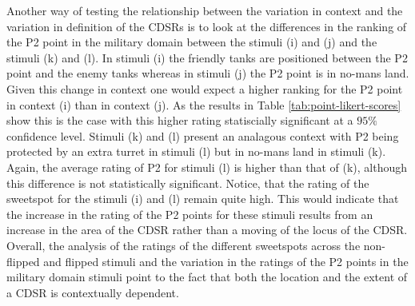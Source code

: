 \documentclass[11pt,letterpaper]{article}
\begin{document}

Another way of testing the relationship between the variation in context and the variation in definition of the CDSRs is to look at the differences in the ranking of the P2 point in the military domain between the stimuli (i) and (j) and the stimuli (k) and (l). In stimuli (i) the friendly tanks are positioned between the P2 point and the enemy tanks whereas in stimuli (j) the P2 point is in no-mans land. Given this change in context one would expect a higher ranking for the P2 point in context (i) than in context (j). As the results in Table \ref{tab:point-likert-scores} show this is the case with this higher rating statiscially significant at a $95\%$ confidence level. Stimuli (k) and (l) present an analagous context with P2 being protected by an extra turret in stimuli (l) but in no-mans land in stimuli (k). Again, the average rating of P2 for stimuli (l) is higher than that of (k), although this difference is not statistically significant. Notice, that the rating of the sweetspot for the stimuli (i) and (l) remain quite high. This would indicate that the increase in the rating of the P2 points for these stimuli results from an increase in the area of the CDSR rather than a moving of the locus of the CDSR. Overall, the analysis of the ratings of the different sweetspots across the non-flipped and flipped stimuli and the variation in the ratings of the P2 points in the military domain stimuli point to the fact that both the location and the extent of a CDSR is contextually dependent.


\end{document}

